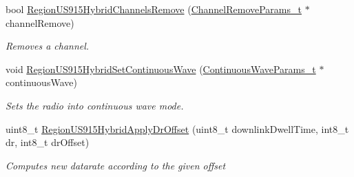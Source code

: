 \begin{DoxyCompactItemize}
bool \mbox{\hyperlink{group___r_e_g_i_o_n_u_s915_h_y_b_ga01abfdc17109559ec3375226baf72331}{Region\+U\+S915\+Hybrid\+Channels\+Remove}} (\mbox{\hyperlink{group___r_e_g_i_o_n_gaa37468560d2fc81a977b57a48e5d72c0}{Channel\+Remove\+Params\+\_\+t}} $\ast$channel\+Remove)
\begin{DoxyCompactList}\small\item\em Removes a channel. \end{DoxyCompactList}\item 
void \mbox{\hyperlink{group___r_e_g_i_o_n_u_s915_h_y_b_gad7b0e2c75aff473cd0c4287d4c6f24d1}{Region\+U\+S915\+Hybrid\+Set\+Continuous\+Wave}} (\mbox{\hyperlink{group___r_e_g_i_o_n_gaf39bb5ba06921139c6d17f88a8d518cd}{Continuous\+Wave\+Params\+\_\+t}} $\ast$continuous\+Wave)
\begin{DoxyCompactList}\small\item\em Sets the radio into continuous wave mode. \end{DoxyCompactList}\item 
uint8\+\_\+t \mbox{\hyperlink{group___r_e_g_i_o_n_u_s915_h_y_b_gaa90275764dd76f7122c3253d2eab2c2f}{Region\+U\+S915\+Hybrid\+Apply\+Dr\+Offset}} (uint8\+\_\+t downlink\+Dwell\+Time, int8\+\_\+t dr, int8\+\_\+t dr\+Offset)
\begin{DoxyCompactList}\small\item\em Computes new datarate according to the given offset \end{DoxyCompactList}\end{DoxyCompactItemize}
